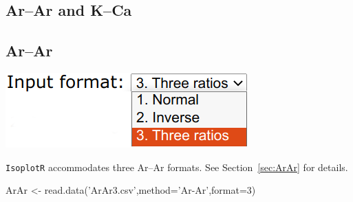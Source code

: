 \begin{refsection}

\chapter{Ar--Ar and K--Ca}
\label{ch:ArArKCa-R}

\section{Ar--Ar}\label{sec:ArAr-R}

\noindent\begin{minipage}[t]{.3\linewidth}
\strut\vspace*{-\baselineskip}\newline
\includegraphics[width=\linewidth]{../figures/PbPbFormats.png}
\end{minipage}
\begin{minipage}[t]{.7\textwidth}
  \texttt{IsoplotR} accommodates three Ar--Ar formats. See
  Section~\ref{sec:ArAr} for details.
\end{minipage}

\begin{console}
ArAr <- read.data('ArAr3.csv',method='Ar-Ar',format=3)
\end{console}


\end{refsection}
